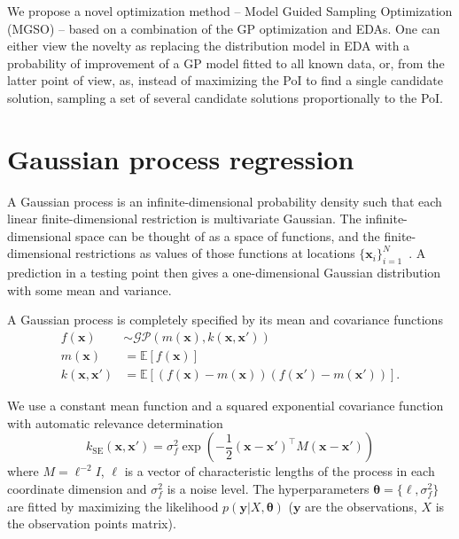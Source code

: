\documentclass{sig-alternate}
\newcommand{\xx}{\mathrm{\mathbf{x}}}
\newcommand{\yy}{\mathrm{\mathbf{y}}}
\newcommand{\ttheta}{\mathbf{\theta}}
\newcommand{\eell}{\boldsymbol\ell}
\begin{document}
We propose a novel optimization method -- Model Guided Sampling Optimization (MGSO) -- based on a combination of 
the GP optimization and EDAs. One can either view the novelty as replacing the distribution model in EDA with 
a probability of improvement of a GP model fitted to all known data, or, from the latter point of view, as, 
instead of maximizing the PoI to find a single candidate solution, sampling a set of several candidate solutions proportionally to the PoI. 

\section{Gaussian process regression}

A Gaussian process \cite{rasmussen2006gaussian} is an infinite-dimensional probability density such that
each linear finite-dimensional restriction is multivariate Gaussian. The
infinite-dimensional space can be thought of as a space of functions, and the
finite-dimensional restrictions as values of those functions at locations $\{\xx_i\}_{i=1}^{N}$~\cite{hennig12entropy}.
A prediction in a testing point then gives a one-dimensional Gaussian distribution with some mean and variance. 

A Gaussian process is completely specified by its mean and covariance functions
\begin{align*}
  f(\xx) &\sim \mathcal{GP}\left( m(\xx), k(\xx, \xx')\right) \\
  m(\xx) &= \mathbb{E} \left[ f(\xx) \right] \\
  k(\xx, \xx') &= \mathbb{E} \left[ (f(\xx) - m(\xx))(f(\xx') - m(\xx')) \right].
\end{align*}

We use a constant mean function and a squared exponential covariance function with
automatic relevance determination
$$
  k_{\mathrm{SE}}(\xx, \xx') = \sigma_f^2 \exp\left( - \frac{1}{2} (\xx - \xx')^\top M (\xx - \xx') \right)
$$
where $ M = \eell^{-2}I $, $\eell$ is a vector of characteristic lengths of the process in each 
coordinate dimension and $\sigma_f^2$ is a noise level. The hyperparameters $\ttheta = \{ \eell, \sigma_f^2 \}$ 
are fitted by maximizing the likelihood $p(\yy | X, \ttheta)$ ($\yy$ are the observations, 
$X$ is the observation points matrix). 
\end{document}
